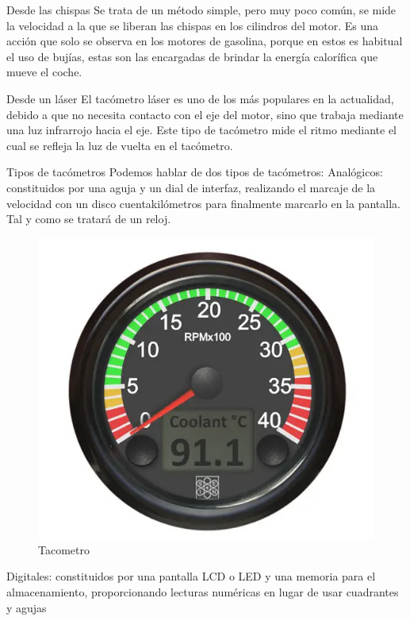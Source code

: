 Desde las chispas
Se trata de un método simple, pero muy poco común, se mide la velocidad a la que se liberan las chispas en los cilindros del motor. Es una acción que solo se observa en los motores de gasolina, porque en estos es habitual el uso de bujías, estas son las encargadas de brindar la energía calorífica que mueve el coche.

Desde un láser
El tacómetro láser es uno de los más populares en la actualidad, debido a que no necesita contacto con el eje del motor, sino que trabaja mediante una luz infrarrojo hacia el eje. Este tipo de tacómetro mide el ritmo mediante el cual se refleja la luz de vuelta en el tacómetro.

Tipos de tacómetros
Podemos hablar de dos tipos de tacómetros:
Analógicos: constituidos por una aguja y un dial de interfaz, realizando el marcaje de la velocidad con un disco cuentakilómetros para finalmente marcarlo en la pantalla. Tal y como se tratará de un reloj.

\begin{figure}[h]
	\centering
	\includegraphics[width=0.7\linewidth]{img/tacometro.png}
	\caption{Tacometro}
	\label{fig:insertarimagen}
\end{figure}

Digitales: constituidos por una pantalla LCD o LED y una memoria para el almacenamiento, proporcionando lecturas numéricas en lugar de usar cuadrantes y agujas

